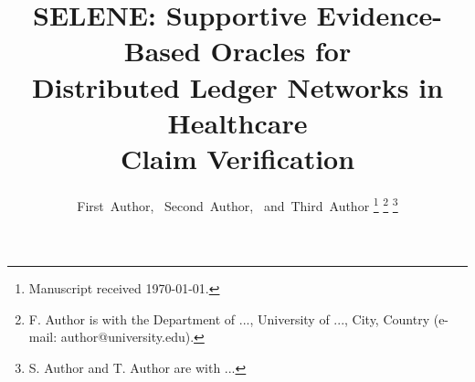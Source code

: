 \documentclass[journal]{IEEEtran}
\theoremstyle{definition}
\theoremstyle{remark}
\begin{document}
\title{SELENE: Supportive Evidence-Based Oracles for\\
       Distributed Ledger Networks in Healthcare\\
       Claim Verification}

\author{First~Author,~
        Second~Author,~
        and~Third~Author%
\thanks{Manuscript received \today.}%
\thanks{F. Author is with the Department of ...,
        University of ..., City, Country
        (e-mail: author@university.edu).}%
\thanks{S. Author and T. Author are with ...}}

\maketitle

\end{document}
